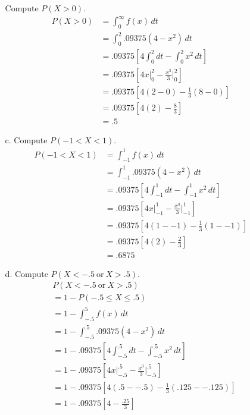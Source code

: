 \documentclass[letterpaper,12pt]{article}
\begin{document}
\begin{enumerate}
\begin{enumerate}
        Compute $P(X > 0)$.
        \begin{align*}
          P(X > 0) &= \int_{0}^{\infty} f(x)\,dt \\
          &= \int_{0}^{2} .09375(4 - x^2)\,dt \\
          &= .09375\left[4\int_{0}^{2} dt - \int_{0}^{2} x^2\,dt\right] \\
          &= .09375\left[4x\big\rvert_{0}^{2} - \frac{x^3}{3}\bigg\rvert_{0}^{2}\right]  \\
          &= .09375\left[4(2 - 0) - \frac{1}{3}(8 - 0)\right] \\
          &= .09375\left[4(2) - \frac{8}{3}\right] \\
          &= .5
        \end{align*}
      \item[c.]
        Compute $P(-1 < X < 1)$.
        \begin{align*}
          P(-1 < X < 1) &= \int_{-1}^{1} f(x)\,dt \\
          &= \int_{-1}^{1} .09375(4 - x^2)\,dt \\
          &= .09375\left[4\int_{-1}^{1} dt - \int_{-1}^{1} x^2\,dt\right] \\
          &= .09375\left[4x\big\rvert_{-1}^{1} - \frac{x^3}{3}\bigg\rvert_{-1}^{1}\right]  \\
          &= .09375\left[4(1 - -1) - \frac{1}{3}(1 - -1)\right] \\
          &= .09375\left[4(2) - \frac{2}{3}\right] \\
          &= .6875
        \end{align*}
      \item[d.]
        Compute $P(X < -.5\ \text{or}\ X > .5)$.
        \begin{align*}
          &P(X < -.5\ \text{or}\ X > .5) \\
          &= 1 - P(-.5 \le X \le .5) \\
          &= 1 - \int_{-.5}^{5} f(x)\,dt \\
          &= 1 - \int_{-.5}^{.5} .09375(4 - x^2)\,dt \\
          &= 1 - .09375\left[4\int_{-.5}^{.5} dt - \int_{-.5}^{.5} x^2\,dt\right] \\
          &= 1 - .09375\left[4x\big\rvert_{-.5}^{.5} - \frac{x^3}{3}\bigg\rvert_{-.5}^{.5}\right]  \\
          &= 1 - .09375\left[4(.5 - -.5) - \frac{1}{3}(.125 - -.125)\right] \\
          &= 1 - .09375\left[4 - \frac{.25}{3}\right] \\

\end{align*}
\end{enumerate}
\end{enumerate}
\end{document}
